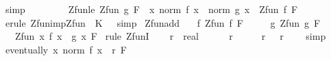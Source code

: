 \begin{isabellebody}
\ simp\isanewline
\ \ \ \ \isamarkupfalse%
\isanewline
\ \ \isamarkupfalse%
\isanewline
{}\isamarkupfalse%
%
\endisatagproof
{\isafoldproof}%
%
\isadelimproof
\isanewline
%
\endisadelimproof
\isanewline
{}\isamarkupfalse%
\ Zfun{\isacharunderscore}{\kern0pt}le{\isacharcolon}{\kern0pt}\ {\isachardoublequoteopen}Zfun\ g\ F\ {\isasymLongrightarrow}\ {\isasymforall}x{\isachardot}{\kern0pt}\ norm\ {\isacharparenleft}{\kern0pt}f\ x{\isacharparenright}{\kern0pt}\ {\isasymle}\ norm\ {\isacharparenleft}{\kern0pt}g\ x{\isacharparenright}{\kern0pt}\ {\isasymLongrightarrow}\ Zfun\ f\ F{\isachardoublequoteclose}\isanewline
%
\isadelimproof
\ \ %
\endisadelimproof
%
\isatagproof
{}\isamarkupfalse%
\ {\isacharparenleft}{\kern0pt}erule\ Zfun{\isacharunderscore}{\kern0pt}imp{\isacharunderscore}{\kern0pt}Zfun\ {\isacharbrackleft}{\kern0pt}\ K\ {\isacharequal}{\kern0pt}\ {}{\isacharbrackright}{\kern0pt}{\isacharparenright}{\kern0pt}\ simp%
\endisatagproof
{\isafoldproof}%
%
\isadelimproof
\isanewline
%
\endisadelimproof
\isanewline
{}\isamarkupfalse%
\ Zfun{\isacharunderscore}{\kern0pt}add{\isacharcolon}{\kern0pt}\isanewline
\ \ \ f{\isacharcolon}{\kern0pt}\ {\isachardoublequoteopen}Zfun\ f\ F{\isachardoublequoteclose}\isanewline
\ \ \ \ \ g{\isacharcolon}{\kern0pt}\ {\isachardoublequoteopen}Zfun\ g\ F{\isachardoublequoteclose}\isanewline
\ \ \ {\isachardoublequoteopen}Zfun\ {\isacharparenleft}{\kern0pt}{\isasymlambda}x{\isachardot}{\kern0pt}\ f\ x\ {\isacharplus}{\kern0pt}\ g\ x{\isacharparenright}{\kern0pt}\ F{\isachardoublequoteclose}\isanewline
%
\isadelimproof
%
\endisadelimproof
%
\isatagproof
{}\isamarkupfalse%
\ {\isacharparenleft}{\kern0pt}rule\ ZfunI{\isacharparenright}{\kern0pt}\isanewline
\ \ \isamarkupfalse%
\ r\ {\isacharcolon}{\kern0pt}{\isacharcolon}{\kern0pt}\ real\isanewline
\ \ \isamarkupfalse%
\ {\isachardoublequoteopen}{}\ {\isacharless}{\kern0pt}\ r{\isachardoublequoteclose}\isanewline
\ \ \isamarkupfalse%
\ \isamarkupfalse%
\ r{\isacharcolon}{\kern0pt}\ {\isachardoublequoteopen}{}\ {\isacharless}{\kern0pt}\ r\ {\isacharslash}{\kern0pt}\ {}{\isachardoublequoteclose}\ \isamarkupfalse%
\ simp\isanewline
\ \ \isamarkupfalse%
\ {\isachardoublequoteopen}eventually\ {\isacharparenleft}{\kern0pt}{\isasymlambda}x{\isachardot}{\kern0pt}\ norm\ {\isacharparenleft}{\kern0pt}f\ x{\isacharparenright}{\kern0pt}\ {\isacharless}{\kern0pt}\ r{\isacharslash}{\kern0pt}{}{\isacharparenright}{\kern0pt}\ F{\isachardoublequoteclose}\isanewline

\end{isabellebody}
